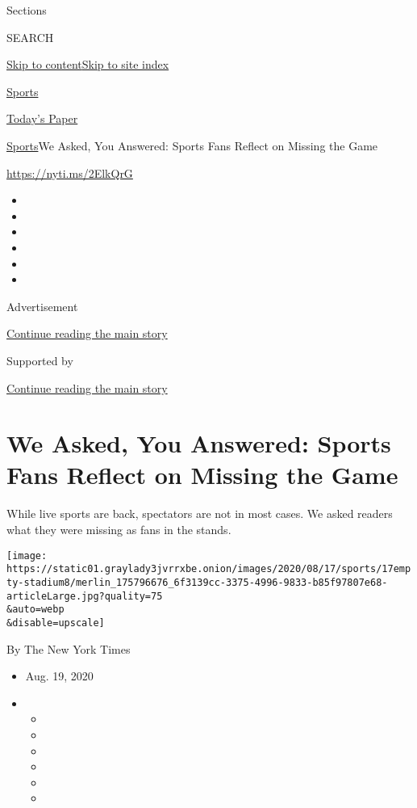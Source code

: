 Sections

SEARCH

\protect\hyperlink{site-content}{Skip to
content}\protect\hyperlink{site-index}{Skip to site index}

\href{https://www.nytimes3xbfgragh.onion/section/sports}{Sports}

\href{https://myaccount.nytimes3xbfgragh.onion/auth/login?response_type=cookie\&client_id=vi}{}

\href{https://www.nytimes3xbfgragh.onion/section/todayspaper}{Today's
Paper}

\href{/section/sports}{Sports}\textbar{}We Asked, You Answered: Sports
Fans Reflect on Missing the Game

\url{https://nyti.ms/2ElkQrG}

\begin{itemize}
\item
\item
\item
\item
\item
\item
\end{itemize}

Advertisement

\protect\hyperlink{after-top}{Continue reading the main story}

Supported by

\protect\hyperlink{after-sponsor}{Continue reading the main story}

\hypertarget{we-asked-you-answered-sports-fans-reflect-on-missing-the-game}{%
\section{We Asked, You Answered: Sports Fans Reflect on Missing the
Game}\label{we-asked-you-answered-sports-fans-reflect-on-missing-the-game}}

While live sports are back, spectators are not in most cases. We asked
readers what they were missing as fans in the stands.

\texttt{[image: https://static01.graylady3jvrrxbe.onion/images/2020/08/17/sports/17empty-stadium8/merlin\_175796676\_6f3139cc-3375-4996-9833-b85f97807e68-articleLarge.jpg?quality=75\\\&auto=webp\\\&disable=upscale]}

By The New York Times

\begin{itemize}
\item
  Aug. 19, 2020
\item
  \begin{itemize}
  \item
  \item
  \item
  \item
  \item
  \item
  \end{itemize}
\end{itemize}


